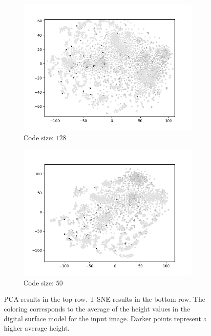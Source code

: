 \begin{figure}[H]
\begin{subfigure}{.25\textwidth}
        \includegraphics[width=\textwidth]{images/figures/experiments_latent/convolutional_dim128_dsm.png}  
        \caption{Code size: $128$} 
    \end{subfigure}%
    \begin{subfigure}{.25\textwidth}
        \centering
        \includegraphics[width=\textwidth]{images/figures/experiments_latent/convolutional_dim50_dsm.png}
        \caption{Code size: $50$}
    \end{subfigure}
    \caption{PCA results in the top row. 
    T-SNE results in the bottom row.  
    The coloring corresponds to the average of the height values in the digital surface model for the
    input image. Darker points represent a higher average height.} \label{figure_heights_convolutional}
\end{figure}

